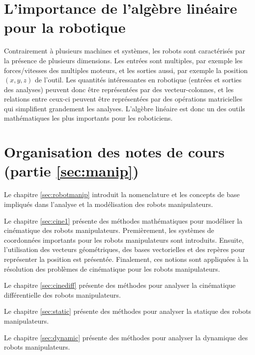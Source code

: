 

\section{L'importance de l'algèbre linéaire pour la robotique}

Contrairement à plusieurs machines et systèmes, les robots sont caractérisés par la présence de plusieurs dimensions. Les entrées sont multiples, par exemple les forces/vitesses des multiples moteurs, et les sorties aussi, par exemple la position $(x,y,z)$ de l'outil. Les quantités intéressantes en robotique (entrées et sorties des analyses) peuvent donc être représentées par des vecteur-colonnes, et les relations entre ceux-ci peuvent être représentées par des opérations matricielles qui simplifient grandement les analyses. L'algèbre linéaire est donc un des outils mathématiques les plus importants pour les roboticiens. 


\section{Organisation des notes de cours (partie \ref{sec:manip})}

Le chapitre \ref{sec:robotmanip} introduit la nomenclature et les concepts de base impliqués dans l'analyse et la modélisation des robots manipulateurs. 

Le chapitre \ref{sec:cine1} présente des méthodes mathématiques pour modéliser la cinématique des robots manipulateurs. Premièrement, les systèmes de coordonnées importants pour les robots manipulateurs sont introduits. Ensuite, l'utilisation des vecteurs géométriques, des bases vectorielles et des repères pour représenter la position est présentée. Finalement, ces notions sont appliquées à la résolution des problèmes de cinématique pour les robots manipulateurs. 

Le chapitre \ref{sec:cinediff} présente des méthodes pour analyser la cinématique différentielle des robots manipulateurs. 

Le chapitre \ref{sec:static} présente des méthodes pour analyser la statique des robots manipulateurs. 

Le chapitre \ref{sec:dynamic} présente des méthodes pour analyser la dynamique des robots manipulateurs. 